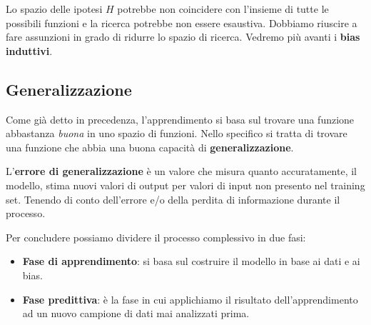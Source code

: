 Lo spazio delle ipotesi $H$ potrebbe non coincidere con l'insieme di tutte le possibili funzioni e la ricerca potrebbe
non essere esaustiva. Dobbiamo riuscire a fare assunzioni in grado di ridurre lo spazio di ricerca. Vedremo pi\`u avanti
i \textbf{bias induttivi}.

\subsection{Generalizzazione}
Come gi\`a detto in precedenza, l'apprendimento si basa sul trovare una funzione abbastanza \emph{buona} in uno spazio di
funzioni. Nello specifico si tratta di trovare una funzione che abbia una buona capacit\`a di \textbf{generalizzazione}.

L'\textbf{errore di generalizzazione} \`e un valore che misura quanto accuratamente, il modello, stima nuovi valori di
output per valori di input non presento nel training set. Tenendo di conto dell'errore e/o della perdita di informazione
durante il processo.

Per concludere possiamo dividere il processo complessivo in due fasi:
\begin{itemize}
	\item \textbf{Fase di apprendimento}: si basa sul costruire il modello in base ai dati e ai bias.
	\item \textbf{Fase predittiva}: \`e la fase in cui applichiamo il risultato dell'apprendimento ad un nuovo campione di
	      dati mai analizzati prima.
\end{itemize}
